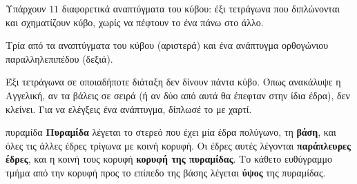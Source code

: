 \begin{center}
\end{center}

Υπάρχουν $11$ διαφορετικά αναπτύγματα του κύβου: έξι τετράγωνα που διπλώνονται και σχηματίζουν κύβο, χωρίς να πέφτουν το ένα πάνω στο άλλο.

\begin{center}
\quad\quad
{}
\end{center}
Τρία από τα αναπτύγματα του κύβου (αριστερά) και ένα ανάπτυγμα ορθογώνιου παραλληλεπιπέδου (δεξιά).

\begin{prosoxi}
Έξι τετράγωνα σε οποιαδήποτε διάταξη δεν δίνουν πάντα κύβο. Όπως ανακάλυψε η Αγγελική, αν τα βάλεις σε σειρά (ή αν δύο από αυτά θα έπεφταν στην ίδια έδρα), δεν κλείνει. Για να ελέγξεις ένα ανάπτυγμα, δίπλωσέ το με χαρτί.
\end{prosoxi}


\begin{orismos}{πυραμίδα}
\textbf{Πυραμίδα} λέγεται το στερεό που έχει μία έδρα πολύγωνο, τη \textbf{βάση}, και όλες τις άλλες έδρες τρίγωνα με κοινή κορυφή. Οι έδρες αυτές λέγονται \textbf{παράπλευρες έδρες}, και η κοινή τους κορυφή \textbf{κορυφή της πυραμίδας}. Το κάθετο ευθύγραμμο τμήμα από την κορυφή προς το επίπεδο της βάσης λέγεται \textbf{ύψος} της πυραμίδας.
\end{orismos}


